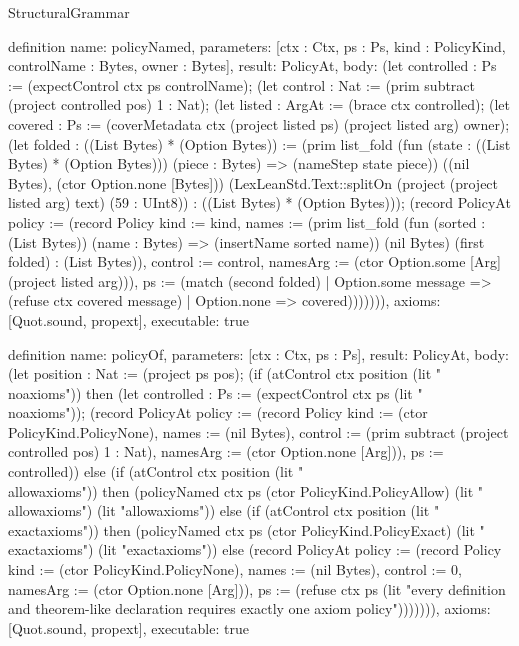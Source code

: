 \begin{lexlean}{StructuralGrammar}
\begin{semanticmodule}
{{definition{
  name: policyNamed,
  parameters: [ctx : Ctx, ps : Ps, kind : PolicyKind, controlName : Bytes, owner : Bytes],
  result: PolicyAt,
  body: (let controlled : Ps := (expectControl ctx ps controlName); (let control : Nat := (prim subtract (project controlled pos) 1 : Nat); (let listed : ArgAt := (brace ctx controlled); (let covered : Ps := (coverMetadata ctx (project listed ps) (project listed arg) owner); (let folded : ((List Bytes) * (Option Bytes)) := (prim list_fold (fun (state : ((List Bytes) * (Option Bytes))) (piece : Bytes) => (nameStep state piece)) ((nil Bytes), (ctor Option.none [Bytes])) (LexLeanStd.Text::splitOn (project (project listed arg) text) (59 : UInt8)) : ((List Bytes) * (Option Bytes))); (record PolicyAt {policy := (record Policy {kind := kind, names := (prim list_fold (fun (sorted : (List Bytes)) (name : Bytes) => (insertName sorted name)) (nil Bytes) (first folded) : (List Bytes)), control := control, namesArg := (ctor Option.some [Arg] (project listed arg))}), ps := (match (second folded)
    | Option.some message => (refuse ctx covered message)
    | Option.none => covered)})))))),
  axioms: [Quot.sound, propext],
  executable: true
}

definition{
  name: policyOf,
  parameters: [ctx : Ctx, ps : Ps],
  result: PolicyAt,
  body: (let position : Nat := (project ps pos); (if (atControl ctx position (lit "\\noaxioms")) then (let controlled : Ps := (expectControl ctx ps (lit "\\noaxioms")); (record PolicyAt {policy := (record Policy {kind := (ctor PolicyKind.PolicyNone), names := (nil Bytes), control := (prim subtract (project controlled pos) 1 : Nat), namesArg := (ctor Option.none [Arg])}), ps := controlled})) else (if (atControl ctx position (lit "\\allowaxioms")) then (policyNamed ctx ps (ctor PolicyKind.PolicyAllow) (lit "\\allowaxioms") (lit "allowaxioms")) else (if (atControl ctx position (lit "\\exactaxioms")) then (policyNamed ctx ps (ctor PolicyKind.PolicyExact) (lit "\\exactaxioms") (lit "exactaxioms")) else (record PolicyAt {policy := (record Policy {kind := (ctor PolicyKind.PolicyNone), names := (nil Bytes), control := 0, namesArg := (ctor Option.none [Arg])}), ps := (refuse ctx ps (lit "every definition and theorem-like declaration requires exactly one axiom policy"))}))))),
  axioms: [Quot.sound, propext],
  executable: true
}

}}
\end{semanticmodule}
\end{lexlean}
